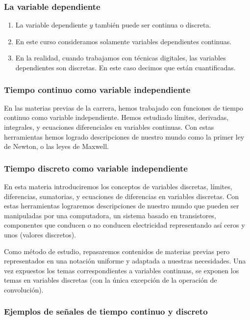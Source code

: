 \documentclass[11pt,a4paper,openany]{book}
\begin{document}
\subsubsection{La variable dependiente}

\begin{enumerate}
	\item La variable dependiente $y$ también puede ser continua o discreta.
	\item En este curso consideramos solamente variables dependientes continuas.
	\item En la realidad, cuando trabajamos con técnicas digitales, las variables dependientes son discretas. En este caso decimos que están cuantificadas.
\end{enumerate}

\subsubsection{Tiempo continuo como variable independiente}
En las materias previas de la carrera, hemos trabajado con funciones de tiempo continuo como variable independiente. Hemos estudiado límites, derivadas, integrales, y ecuaciones diferenciales en variables continuas. Con estas herramientas hemos logrado descripciones de nuestro mundo como la primer ley de Newton, o las leyes de Maxwell.

\subsubsection{Tiempo discreto como variable independiente}
En esta materia introduciremos los conceptos de variables discretas, límites, diferencias, sumatorias, y ecuaciones de diferencias en variables discretas. Con estas herramientas lograremos descripciones de nuestro mundo que pueden ser manipuladas por una computadora, un sistema basado en transistores, componentes que conducen o no conducen electricidad representando así ceros y unos (valores discretos).

Como método de estudio, repasaremos contenidos de materias previas pero representados en una notación uniforme y adaptada a nuestras necesidades. Una vez expuestos los temas correspondientes a variables continuas, se exponen los temas en variables discretas (con la única excepción de la operación de convolución).

\subsubsection{Ejemplos de señales de tiempo continuo y discreto}
\end{document}
